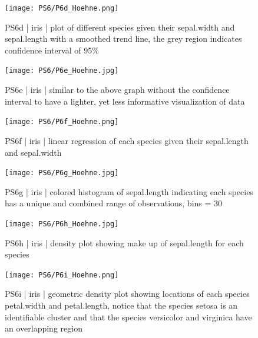 \documentclass{article}
\begin{document}
\begin{figure}
\centering
\texttt{[image: PS6/P6d\_Hoehne.png]}\\
\caption{PS6d | iris | plot of different species given their sepal.width and sepal.length with a smoothed trend line, the grey region indicates confidence interval of 95\%}
\end{figure}

\begin{figure}
\centering
\texttt{[image: PS6/P6e\_Hoehne.jpg]}\\
\caption{PS6e | iris | similar to the above graph without the confidence interval to have a lighter, yet less informative visualization of data}
\end{figure}

\begin{figure}
\centering
\texttt{[image: PS6/P6f\_Hoehne.png]}\\
\caption{PS6f | iris | linear regression of each species given their sepal.length and sepal.width}
\end{figure}

\begin{figure}
\centering
\texttt{[image: PS6/P6g\_Hoehne.jpg]}\\
\caption{PS6g | iris | colored histogram of sepal.length indicating each species has a unique and combined range of observations, bins = 30}
\end{figure}

\begin{figure}
\centering
\texttt{[image: PS6/P6h\_Hoehne.jpg]}\\
\caption{PS6h | iris | density plot showing make up of sepal.length for each species}
\end{figure}

\begin{figure}
\centering
\texttt{[image: PS6/P6i\_Hoehne.png]}\\
\caption{PS6i | iris | geometric density plot showing locations of each species petal.width and petal.length, notice that the species setosa is an identifiable cluster and that the species versicolor and virginica have an overlapping region}
\end{figure}

\centering
\end{document}
